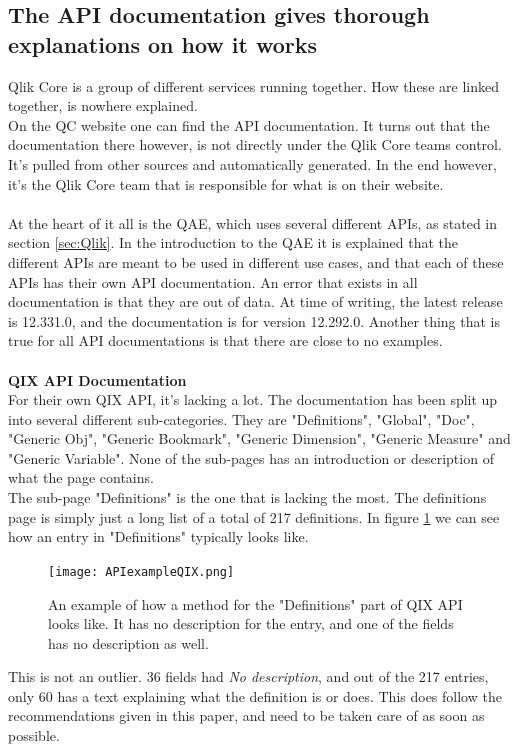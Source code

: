 \documentclass{cslthse-msc}
\begin{document}
    \subsection{The API documentation gives thorough explanations on how it works}\label{APIexplained}
    Qlik Core is a group of different services running together. How these are linked together, is nowhere explained.\\
    On the QC website one can find the API documentation. It turns out that the documentation there however, is not directly under the Qlik Core teams control. It's pulled from other sources and automatically generated. In the end however, it's the Qlik Core team that is responsible for what is on their website. \\ \\
    At the heart of it all is the QAE, which uses several different APIs, as stated in section \ref{sec:Qlik}. In the introduction to the QAE it is explained that the different APIs are meant to be used in different use cases, and that each of these APIs has their own API documentation. An error that exists in all documentation is that they are out of data. At time of writing, the latest release is 12.331.0, and the documentation is for version 12.292.0. Another thing that is true for all API documentations is that there are close to no examples. \\ \\
    \textbf{QIX API Documentation}\\
    For their own QIX API, it's lacking a lot. The documentation has been split up into several different sub-categories. They are "Definitions", "Global", "Doc", "Generic Obj", "Generic Bookmark", "Generic Dimension", "Generic Measure" and "Generic Variable". None of the sub-pages has an introduction or description of what the page contains. \\
    The sub-page "Definitions" is the one that is lacking the most. The definitions page is simply just a long list of a total of 217 definitions. In figure \ref{fig:qixmethod} we can see how an entry in "Definitions" typically looks like.
    \begin{figure}[H]
        \centering
        \texttt{[image: APIexampleQIX.png]}
        \caption{An example of how a method for the "Definitions" part of QIX API looks like. It has no description for the entry, and one of the fields has no description as well.}
        \label{fig:qixmethod}
    \end{figure}
    This is not an outlier. 36 fields had \textit{No description}, and out of the 217 entries, only 60 has a text explaining what the definition is or does. This does  follow the recommendations given in this paper, and need to be taken care of as soon as possible.\\
\end{document}
